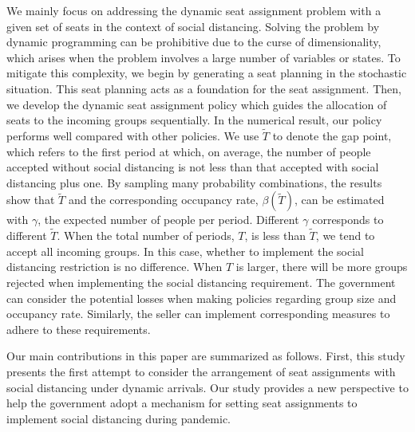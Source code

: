 We mainly focus on addressing the dynamic seat assignment problem with a given set of seats in the context of social distancing. Solving the problem by dynamic programming can be prohibitive due to the curse of dimensionality, which arises when the problem involves a large number of variables or states. To mitigate this complexity, we begin by generating a seat planning in the stochastic situation. This seat planning acts as a foundation for the seat assignment. Then, we develop the dynamic seat assignment policy which guides the allocation of seats to the incoming groups sequentially. In the numerical result, our policy performs well compared with other policies. 
We use $\tilde{T}$ to denote the gap point, which refers to the first period at which, on average, the number of people accepted without social distancing is not less than that accepted with social distancing plus one. By sampling many probability combinations, the results show that $\tilde{T}$ and the corresponding occupancy rate, $\beta(\tilde{T})$, can be estimated with $\gamma$, the expected number of people per period. Different $\gamma$ corresponds to different $\tilde{T}$. When the total number of periods, $T$, is less than $\tilde{T}$, we tend to accept all incoming groups. In this case, whether to implement the social distancing restriction is no difference. When $T$ is larger, there will be more groups rejected when implementing the social distancing requirement. The government can consider the potential losses when making policies regarding group size and occupancy rate. Similarly, the seller can implement corresponding measures to adhere to these requirements.


Our main contributions in this paper are summarized as follows. First, this study presents the first attempt to consider the arrangement of seat assignments with social distancing under dynamic arrivals. Our study provides a new perspective to help the government adopt a mechanism for setting seat assignments to implement social distancing during pandemic.



